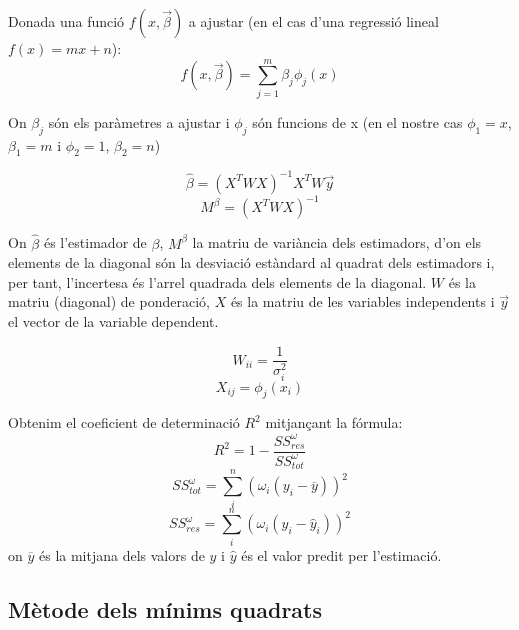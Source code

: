\documentclass[11pt]{article}
\numberwithin{equation}{section}
\numberwithin{figure}{section}
\numberwithin{table}{section}
\begin{document}
 Donada una funció $f(x,\vec{\beta})$ a ajustar (en el cas d'una regressió lineal $f(x) = mx+n$):
 \begin{equation}
     f(x,\vec{\beta}) = \sum_{j=1}^m\beta_j\phi_j(x)
 \end{equation}
 
  On ${\beta_j}$ són els paràmetres a ajustar i $\phi_j$ són funcions de x (en el nostre cas $\phi_1 = x$, $\beta_1 = m$ i $\phi_2 = 1$, $\beta_2 = n$)
 
 \begin{equation}
     \hat{\beta} = (X^TWX)^{-1}X^TW\vec{y}
 \end{equation}
 \begin{equation}
     M^\beta = (X^TWX)^{-1}
 \end{equation}
 
 On $\hat{\beta}$ és l'estimador de $\beta$, $M^\beta$ la matriu de variància dels estimadors, d'on els elements de la diagonal són la desviació estàndard al quadrat dels estimadors i, per tant, l'incertesa és l'arrel quadrada dels elements de la diagonal. $W$ és la matriu (diagonal) de ponderació, $X$ és la matriu de les variables independents i $\vec{y}$ el vector de la variable dependent.
 
 \begin{equation}
     W_{ii} = \frac{1}{\sigma_i^2}
 \end{equation}
 \begin{equation}
     X_{ij} = \phi_j(x_i)
 \end{equation}

Obtenim el coeficient de determinació $R^2$ mitjançant la fórmula:
\begin{equation}
    R^2 = 1 - \frac{SS_{res}^\omega}{SS_{tot}^\omega}
\end{equation}
\begin{equation}
    SS_{tot}^\omega = \sum^n_{i}(\omega_i(y_i-\overline{y}))^2
\end{equation}
\begin{equation}
    SS_{res}^\omega = \sum^n_{i}(\omega_i(y_i-\hat{y}_i))^2
\end{equation}
on $\overline{y}$ és la mitjana dels valors de $y$ i $\hat{y}$ és el valor predit per l'estimació.

\subsection{Mètode dels mínims quadrats} \label{sec: mínims_quadrats}
\end{document}
